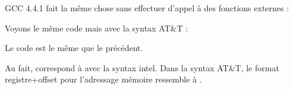 
GCC 4.4.1 fait la même chose sans effectuer d'appel à des fonctions externes :




Voyons le même code mais avec la syntax AT\&T : 



\myindex{\ATTSyntax}
Le code est le même que le précédent.

Au fait,  correspond à
 avec la syntax intel.
Dans la syntax AT\&T, le format registre+offset pour l'adressage mémoire
ressemble à .
